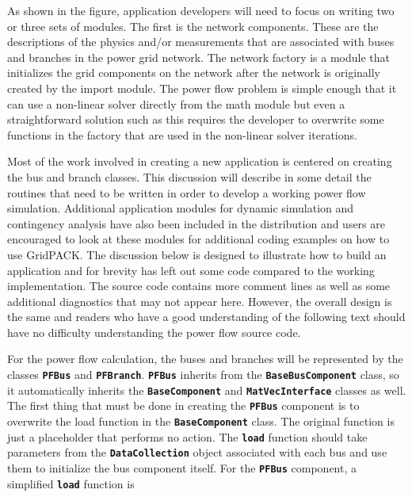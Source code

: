 \documentclass[12pt]{report} %
\begin{document}

As shown in the figure, application developers will need to focus on writing two or three sets of modules. The first is the network components. These are the descriptions of the physics and/or measurements that are associated with buses and branches in the power grid network. The network factory is a module that initializes the grid components on the network after the network is originally created by the import module. The power flow problem is simple enough that it can use a non-linear solver directly from the math module but even a straightforward solution such as this requires the developer to overwrite some functions in the factory that are used in the non-linear solver iterations.

Most of the work involved in creating a new application is centered on creating the bus and branch classes. This discussion will describe in some detail the routines that need to be written in order to develop a working power flow simulation. Additional application modules for dynamic simulation and contingency analysis have also been included in the distribution and users are encouraged to look at these modules for additional coding examples on how to use GridPACK. The discussion below is designed to illustrate how to build an application and for brevity has left out some code compared to the working implementation. The source code contains more comment lines as well as some additional diagnostics that may not appear here. However, the overall design is the same and readers who have a good understanding of the following text should have no difficulty understanding the power flow source code.

For the power flow calculation, the buses and branches will be represented by the classes \texttt{\textbf{PFBus}} and \texttt{\textbf{PFBranch}}. \texttt{\textbf{PFBus}} inherits from the \texttt{\textbf{BaseBusComponent}} class, so it automatically inherits the \texttt{\textbf{BaseComponent}} and \texttt{\textbf{MatVecInterface}} classes as well. The first thing that must be done in creating the \texttt{\textbf{PFBus}} component is to overwrite the load function in the \texttt{\textbf{BaseComponent}} class. The original function is just a placeholder that performs no action. The \texttt{\textbf{load}} function should take parameters from the \texttt{\textbf{DataCollection}} object associated with each bus and use them to initialize the bus component itself. For the \texttt{\textbf{PFBus}} component, a simplified \texttt{\textbf{load}} function is
\end{document}
